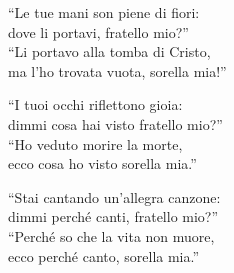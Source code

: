
\strofa ``Le tue mani son piene di fiori:\\
dove li portavi, fratello mio?''\\
``Li portavo alla tomba di Cristo,\\
ma l'ho trovata vuota, sorella mia!''

\spazio


\spazio

\strofa ``I tuoi occhi riflettono gioia:\\
dimmi cosa hai visto fratello mio?''\\
``Ho veduto morire la morte,\\
ecco cosa ho visto sorella mia.''

\spazio


\spazio

\strofa ``Stai cantando un'allegra canzone:\\
dimmi perché canti, fratello mio?''\\
``Perché so che la vita non muore,\\
ecco perché canto, sorella mia.''

\spazio


